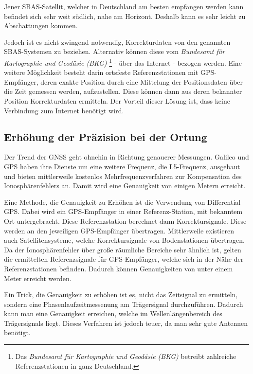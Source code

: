 \documentclass[letterpaper,11pt,ngerman]{andi}
\begin{document}
Jener SBAS-Satellit, welcher in Deutschland am besten empfangen werden kann befindet sich sehr weit südlich, nahe am Horizont. Deshalb kann es sehr leicht zu Abschattungen kommen. \cite{sat_nav_schildt}

Jedoch ist es nicht zwingend notwendig, Korrekturdaten von den genannten SBAS-Systemen zu beziehen. Alternativ können diese vom \emph{Bundesamt für Kartographie und Geodäsie (BKG)} \footnote{
Das \emph{Bundesamt für Kartographie und Geodäsie (BKG)} betreibt zahlreiche Referenzstationen in ganz Deutschland.
} - über das Internet - bezogen werden. Eine weitere Möglichkeit besteht darin ortsfeste Referenzstationen mit GPS-Empfänger, deren exakte Position durch eine Mittelung der Positionsdaten über die Zeit gemessen werden, aufzustellen. Diese können dann aus deren bekannter Position Korrekturdaten ermitteln. Der Vorteil dieser Lösung ist, dass keine Verbindung zum Internet benötigt wird.


\subsection{Erhöhung der Präzision bei der Ortung}
\label{included_projects/gps/GPS_SPEC/content:erhohung-der-prazision-bei-der-ortung}
Der Trend der GNSS geht ohnehin in Richtung genauerer Messungen. Galileo und GPS haben ihre Dienste um eine weitere Frequenz, die L5-Frequenz, ausgebaut und bieten mittlerweile kostenlos Mehrfrequenzverfahren zur Kompensation des Ionosphärenfehlers an. Damit wird eine Genauigkeit von einigen Metern erreicht. \cite{podcast}

Eine Methode, die Genauigkeit zu Erhöhen ist die Verwendung von Differential GPS. Dabei wird ein GPS-Empfänger in einer Referenz-Station, mit bekanntem Ort untergebracht. Diese Referenzstation berechnet dann Korrektursignale. Diese werden an den jeweiligen GPS-Empfänger übertragen. Mittlerweile existieren auch Satellitensysteme, welche Korrektursignale von Bodenstationen übertragen. Da der Ionosphärenfehler über große räumliche Bereiche sehr ähnlich ist, gelten die ermittelten Referenzsignale für GPS-Empfänger, welche sich in der Nähe der Referenzstationen befinden. Dadurch können Genauigkeiten von unter einem Meter erreicht werden. \cite{podcast}

Ein Trick, die Genauigkeit zu erhöhen ist es, nicht das Zeitsignal zu ermitteln, sondern eine Phasenlaufzeitmessenung am Trägersignal durchzuführen. Dadurch kann man eine Genauigkeit erreichen, welche im Wellenlängenbereich des Trägersignals liegt. Dieses Verfahren ist jedoch teuer, da man sehr gute Antennen benötigt. \cite{podcast}
\end{document}

